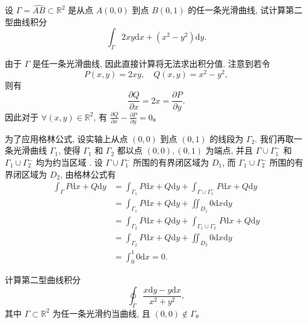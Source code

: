 \documentclass[12pt,fontset=fandol]{ctexart}
\begin{document}
\begin{example}\label{course-example-16-5-1}\quad 设 $\Gamma=\widehat{AB}\subset\mathbb R^2$ 是从点 $A(0,0)$ 到点 $B(0,1)$ 的任一条光滑曲线, 试计算第二型曲线积分
\[
  \int_\Gamma 2xy\mathrm dx+(x^2-y^2)\mathrm dy.
\]

\end{example}
\begin{solve}\quad 由于 $\Gamma$ 是任一条光滑曲线, 因此直接计算将无法求出积分值. 注意到若令
\[
  P(x,y)=2xy,\quad Q(x,y)=x^2-y^2,
\]
则有
\[
  \frac{\partial Q}{\partial x}=2x=\frac{\partial P}{\partial y}.
\]
因此对于 $\forall(x,y)\in\mathbb R^2$, 有 $\frac{\partial Q}{\partial x}-\frac{\partial P}{\partial y}=0$。

为了应用格林公式, 设实轴上从点 $(0,0)$ 到点 $(0,1)$ 的线段为 $\Gamma_2$. 我们再取一条光滑曲线 $\Gamma_1$, 使得 $\Gamma_1$ 和 $\Gamma_2$ 都以点 $(0,0),(0,1)$ 为端点, 并且 $\Gamma\cup\Gamma_1^-$ 和 $\Gamma_1\cup\Gamma_2^-$ 均为约当区域 . 设 $\Gamma\cup\Gamma_1^-$ 所围的有界闭区域为 $D_1$, 而 $\Gamma_1\cup\Gamma_2^-$ 所围的有界闭区域为 $D_2$, 由格林公式有
\[
\begin{aligned}
  \int_\Gamma P\mathrm dx+Q\mathrm dy
  &=\int_{\Gamma_1}P\mathrm dx+Q\mathrm dy+\int_{\Gamma\cup\Gamma_1^-}P\mathrm dx+Q\mathrm dy\\
  &=\int_{\Gamma_1}P\mathrm dx+Q\mathrm dy+\iint_{D_1}0\mathrm dx\mathrm dy\\
  &=\int_{\Gamma_2}P\mathrm dx+Q\mathrm dy+\int_{\Gamma_1\cup\Gamma_2^-}P\mathrm dx+Q\mathrm dy\\
  &=\int_{\Gamma_2}P\mathrm dx+Q\mathrm dy+\iint_{D_2}0\mathrm dx\mathrm dy\\
  &=\int_0^1 0\mathrm dx=0.
\end{aligned}
\]

\end{solve}
\begin{example}\label{course-example-16-5-2}\quad 计算第二型曲线积分
\[
  \oint_\Gamma\frac{x\mathrm dy-y\mathrm dx}{x^2+y^2},
\]
其中 $\Gamma\subset\mathbb R^2$ 为任一条光滑约当曲线, 且 $(0,0)\notin\Gamma$。

\end{example}
\end{document}

